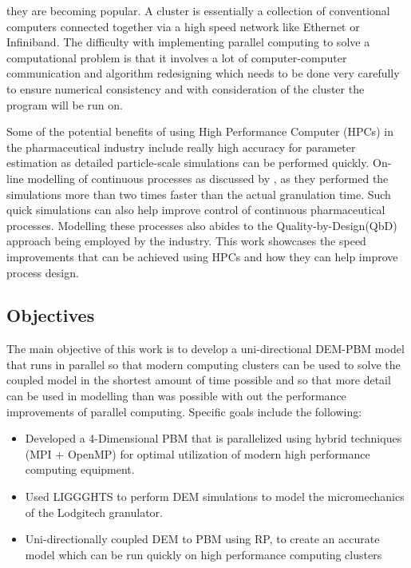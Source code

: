 \documentclass[preprint,11pt,authoryear]{elsarticle}
\begin{document}
    they are becoming popular. A cluster is essentially a collection of conventional computers 
    connected together via a high speed network like Ethernet or Infiniband. The difficulty with 
    implementing parallel computing to solve a computational problem is that it involves a lot of 
    computer-computer communication and algorithm redesigning which needs to be done very 
    carefully to ensure numerical consistency and with consideration of the cluster the program will be 
    run on.
	\par Some of the potential benefits of using High Performance Computer (HPCs) in the 
    pharmaceutical industry include really high accuracy for parameter estimation as detailed 
    particle-scale simulations can be performed quickly. On-line modelling of continuous processes as 
    discussed by \citep{Bettencourt2017}, as they performed the simulations more than two times faster 
    than the actual granulation time. Such quick simulations can also help improve control of 
    continuous pharmaceutical processes. Modelling these processes also abides to the 
    Quality-by-Design(QbD) approach being employed by the industry. This work showcases the speed 
    improvements that can be achieved using HPCs and how they can help improve process design.  
	
	    \subsection{Objectives}
	    \par The main objective of this work is to develop a uni-directional DEM-PBM model that runs in 
        parallel so that modern computing clusters can be used to solve the coupled model in the 
        shortest amount of time possible and so that more detail can be used in modelling than was 
        possible with out the performance improvements of parallel computing. Specific goals include the 
        following:
	    \begin{itemize}
	    \item Developed a 4-Dimensional PBM that is parallelized using hybrid techniques (MPI + 
        OpenMP)  for optimal utilization of modern high performance computing equipment.
	    \item Used LIGGGHTS to perform DEM simulations to  model the micromechanics of the 
        Lodgitech granulator. 
		\item Uni-directionally coupled DEM to PBM using RP, to create an accurate model which can be 
        run quickly on high performance computing clusters
	    \end{itemize}
\end{document}
